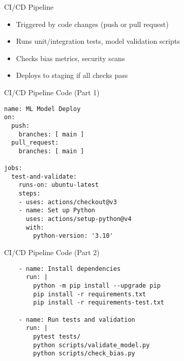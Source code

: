 \documentclass[aspectratio=169]{beamer}
\begin{document}
\begin{frame}{CI/CD Pipeline}



\begin{itemize}
\item Triggered by code changes (push or pull request)
\item Runs unit/integration tests, model validation scripts
\item Checks bias metrics, security scans
\item Deploys to staging if all checks pass
\end{itemize}
\end{frame}


\begin{frame}[fragile]{CI/CD Pipeline Code (Part 1)}
\begin{verbatim}
name: ML Model Deploy
on:
  push:
    branches: [ main ]
  pull_request:
    branches: [ main ]

jobs:
  test-and-validate:
    runs-on: ubuntu-latest
    steps:
    - uses: actions/checkout@v3
    - name: Set up Python
      uses: actions/setup-python@v4
      with:
        python-version: '3.10'
\end{verbatim}
\end{frame}


\begin{frame}[fragile]{CI/CD Pipeline Code (Part 2)}
\begin{verbatim}
    - name: Install dependencies
      run: |
        python -m pip install --upgrade pip
        pip install -r requirements.txt
        pip install -r requirements-test.txt

    - name: Run tests and validation
      run: |
        pytest tests/
        python scripts/validate_model.py
        python scripts/check_bias.py
\end{verbatim}
\end{frame}
\end{document}
